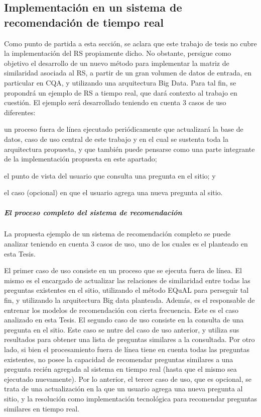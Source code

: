 \subsection{Implementación en un sistema de recomendación de tiempo real}

Como punto de partida a esta sección, se aclara que este trabajo de tesis no cubre la implementación del RS propiamente dicho. No obstante, persigue como objetivo el desarrollo de un nuevo método para implementar la matriz de similaridad asociada al RS, a partir de un gran volumen de datos de entrada, en particular en CQA, y utilizando una arquitectura Big Data. Para tal fin, se propondrá un ejemplo de RS a tiempo real, que dará contexto al trabajo en cuestión. El ejemplo será desarrollado teniendo en cuenta 3 casos de uso diferentes: \begin{enumerate*} [label=(\roman*)] \item un proceso fuera de línea ejecutado periódicamente que actualizará la base de datos, caso de uso central de este trabajo y en el cual se sustenta toda la arquitectura propuesta, y que también puede pensarse como una parte integrante de la implementación propuesta en este apartado; \item el punto de vista del usuario que consulta una pregunta en el sitio; y \item el caso (opcional) en que el usuario agrega una nueva pregunta al sitio.\end{enumerate*}

\subparagraph{El proceso completo del sistema de recomendación}
La propuesta ejemplo de un sistema de recomendación completo se puede analizar teniendo en cuenta 3 casos de uso, uno de los cuales es el planteado en esta Tesis.

\bigskip El primer caso de uso consiste en un proceso que se ejecuta fuera de línea. El mismo es el encargado de actualizar las relaciones de similaridad entre todas las preguntas existentes en el sitio, utilizando el método EQuAL para perseguir tal fin, y utilizando la arquitectura Big data planteada. Además, es el responsable de entrenar los modelos de recomendación con cierta frecuencia. Este es el caso analizado en esta Tesis. El segundo caso de uso consiste en la consulta de una pregunta en el sitio. Este caso se nutre del caso de uso anterior, y utiliza sus resultados para obtener una lista de preguntas similares a la consultada. Por otro lado, si bien el procesamiento fuera de línea tiene en cuenta todas las preguntas existentes, no posee la capacidad de recomendar preguntas similares a una pregunta recién agregada al sistema en tiempo real (hasta que el mismo sea ejecutado nuevamente). Por lo anterior, el tercer caso de uso, que es opcional, se trata de una actualización en la que un usuario agrega una nueva pregunta al sitio, y la resolución como implementación tecnológica para recomendar preguntas similares en tiempo real.


